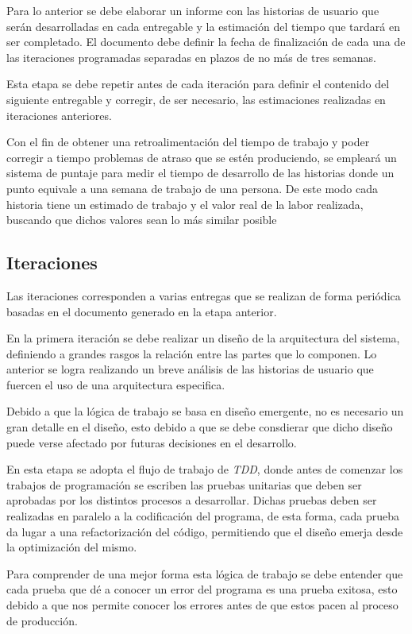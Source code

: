 Para lo anterior se debe elaborar un informe con las historias de usuario que serán desarrolladas en cada entregable y la estimación del tiempo que tardará en ser completado. El documento debe definir la fecha de finalización de cada una de las iteraciones programadas separadas en plazos de no más de tres semanas. 

Esta etapa se debe repetir antes de cada iteración para definir el contenido del siguiente entregable y corregir, de ser necesario, las estimaciones realizadas en iteraciones anteriores.

Con el fin de obtener una retroalimentación del tiempo de trabajo y poder corregir a tiempo problemas de atraso que se estén produciendo, se empleará un sistema de puntaje para medir el tiempo de desarrollo de las historias donde un punto equivale a una semana de trabajo de una persona. De este modo cada historia tiene un estimado de trabajo y el valor real de la labor realizada, buscando que dichos valores sean lo más similar posible

\subsection{Iteraciones}

Las iteraciones corresponden a varias entregas que se realizan de forma periódica basadas en el documento generado en la etapa anterior.

En la primera iteración se debe realizar un diseño de la arquitectura del sistema, definiendo a grandes rasgos la relación entre las partes que lo componen. Lo anterior se logra realizando un breve análisis de las historias de usuario que fuercen el uso de una arquitectura especifica. 

Debido a que la lógica de trabajo se basa en diseño emergente, no es necesario un gran detalle en el diseño, esto debido a que se debe consdierar que dicho diseño puede verse afectado por futuras decisiones en el desarrollo.

En esta etapa se adopta el flujo de trabajo de \textit{TDD}, donde antes de comenzar los trabajos de programación se escriben las pruebas unitarias que deben ser aprobadas por los distintos procesos a desarrollar. Dichas pruebas deben ser realizadas en paralelo a la codificación del programa, de esta forma, cada prueba da lugar a una refactorización del código, permitiendo que el diseño emerja desde la optimización del mismo.

Para comprender de una mejor forma esta lógica de trabajo se debe entender que cada prueba que dé a conocer un error del programa es una prueba exitosa, esto debido a que nos permite conocer los errores antes de que estos pacen al proceso de producción. 

